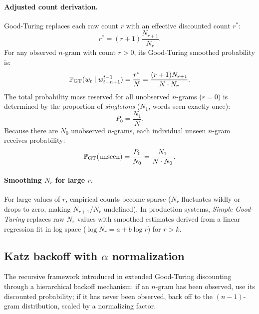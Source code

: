 \documentclass[../../main.tex]{subfiles}
\begin{document}
\paragraph{Adjusted count derivation.}
Good-Turing replaces each raw count $r$ with an effective discounted count $r^*$:
\begin{equation}
\label{eq:good_turing_rstar}
r^* = (r + 1) \frac{N_{r+1}}{N_r}.
\end{equation}
For any observed $n$-gram with count $r > 0$, its Good-Turing smoothed probability is:
\begin{equation}
\label{eq:good_turing_prob}
\mathbb{P}_{\text{GT}}(w_t \mid w_{t-n+1}^{t-1}) = \frac{r^*}{N} = \frac{(r + 1) N_{r+1}}{N \cdot N_r}.
\end{equation}
The total probability mass reserved for all unobserved $n$-grams ($r = 0$) is determined by the proportion of \emph{singletons} ($N_1$, words seen exactly once):
\begin{equation}
\label{eq:good_turing_p0}
P_0 = \frac{N_1}{N}.
\end{equation}
Because there are $N_0$ unobserved $n$-grams, each individual unseen $n$-gram receives probability:
\begin{equation}
\label{eq:good_turing_unseen}
\mathbb{P}_{\text{GT}}(\text{unseen}) = \frac{P_0}{N_0} = \frac{N_1}{N \cdot N_0}.
\end{equation}

\paragraph{Smoothing $N_r$ for large $r$.}
For large values of $r$, empirical counts become sparse ($N_r$ fluctuates wildly or drops to zero, making $N_{r+1}/N_r$ undefined). In production systems, \emph{Simple Good-Turing} \cite{manning1999} replaces raw $N_r$ values with smoothed estimates derived from a linear regression fit in log space ($\log N_r = a + b \log r$) for $r > k$.

\subsection{Katz backoff with \texorpdfstring{$\alpha$}{alpha} normalization}
The recursive framework introduced in \cite{katz1987} extended Good-Turing discounting through a hierarchical backoff mechanism: if an $n$-gram has been observed, use its discounted probability; if it has never been observed, back off to the $(n-1)$-gram distribution, scaled by a normalizing factor.
\end{document}
